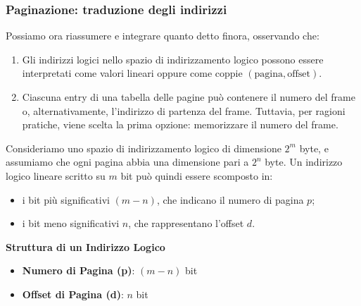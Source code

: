 \subsubsection{Paginazione: traduzione degli indirizzi}
Possiamo ora riassumere e integrare quanto detto finora, osservando che:

\begin{enumerate}
    \item Gli indirizzi logici nello spazio di indirizzamento logico possono essere interpretati come valori lineari oppure come coppie $(\text{pagina}, \text{offset})$.
    \item Ciascuna entry di una tabella delle pagine può contenere il numero del frame o, alternativamente, l’indirizzo di partenza del frame. Tuttavia, per ragioni pratiche, viene scelta la prima opzione: memorizzare il numero del frame.
\end{enumerate}


Consideriamo uno spazio di indirizzamento logico di dimensione $2^m$ byte, e assumiamo che ogni pagina abbia una dimensione pari a $2^n$ byte. Un indirizzo logico lineare scritto su $m$ bit può quindi essere scomposto in:
\begin{itemize}
    \item i bit più significativi $(m - n)$, che indicano il numero di pagina $p$;
    \item i bit meno significativi $n$, che rappresentano l’offset $d$.
\end{itemize}

\begin{center}
    \textbf{Struttura di un Indirizzo Logico}
\end{center}
\begin{itemize}
    \item \textbf{Numero di Pagina (p)}: $(m - n)$ bit
    \item \textbf{Offset di Pagina (d)}: $n$ bit
\end{itemize}

